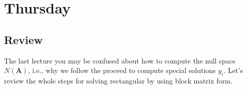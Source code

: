 

\section{Thursday}
\subsection{Review}
The last lecture you may be confused about how to compute the null space $N(\bm A)$, i.e., why we follow the proceed to compute special solutions $y_i$. Let's review the whole steps for solving rectangular by using block matrix form.

